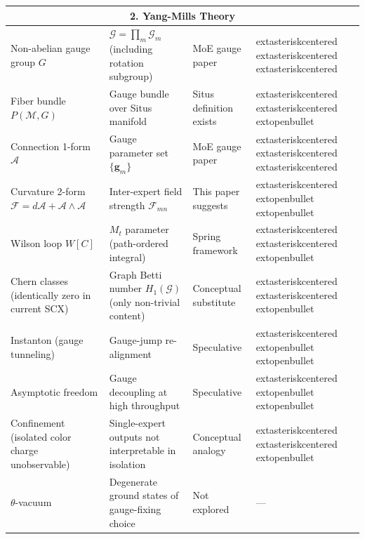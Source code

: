 \documentclass[12pt,a4paper]{article}
\newcommand{\grph}{\mathcal{G}}
\theoremstyle{remark}
\newcommand{\gaugeparam}{\mathbf{g}}
\newcommand{\calG}{\mathcal{G}}
\begin{document}
\begin{longtable}{p{4.2cm} p{5cm} p{4cm} p{2cm}}
\midrule
\multicolumn{4}{c}{\textbf{2. Yang-Mills Theory}} \\
\midrule
Non-abelian gauge group $G$ & $\calG = \prod_m \calG_m$ (including rotation subgroup) & MoE gauge paper & 	extasteriskcentered	extasteriskcentered	extasteriskcentered \\
Fiber bundle $P(\mathcal{M}, G)$ & Gauge bundle over Situs manifold & Situs definition exists & 	extasteriskcentered	extasteriskcentered	extopenbullet \\
Connection 1-form $\mathcal{A}$ & Gauge parameter set $\{\gaugeparam_m\}$ & MoE gauge paper & 	extasteriskcentered	extasteriskcentered	extasteriskcentered \\
Curvature 2-form $\mathcal{F} = d\mathcal{A} + \mathcal{A}\wedge\mathcal{A}$ & Inter-expert field strength $\mathcal{F}_{mn}$ & This paper suggests & 	extasteriskcentered	extopenbullet	extopenbullet \\
Wilson loop $W[C]$ & $M_t$ parameter (path-ordered integral) & Spring framework & 	extasteriskcentered	extasteriskcentered	extopenbullet \\
Chern classes (identically zero in current SCX) & Graph Betti number $H_1(\grph)$ (only non-trivial content) & Conceptual substitute & 	extasteriskcentered	extasteriskcentered	extopenbullet \\
Instanton (gauge tunneling) & Gauge-jump re-alignment & Speculative & 	extasteriskcentered	extopenbullet	extopenbullet \\
Asymptotic freedom & Gauge decoupling at high throughput & Speculative & 	extasteriskcentered	extopenbullet	extopenbullet \\
Confinement (isolated color charge unobservable) & Single-expert outputs not interpretable in isolation & Conceptual analogy & 	extasteriskcentered	extasteriskcentered	extopenbullet \\
$\theta$-vacuum & Degenerate ground states of gauge-fixing choice & Not explored & — \\


\end{longtable}
\end{document}
